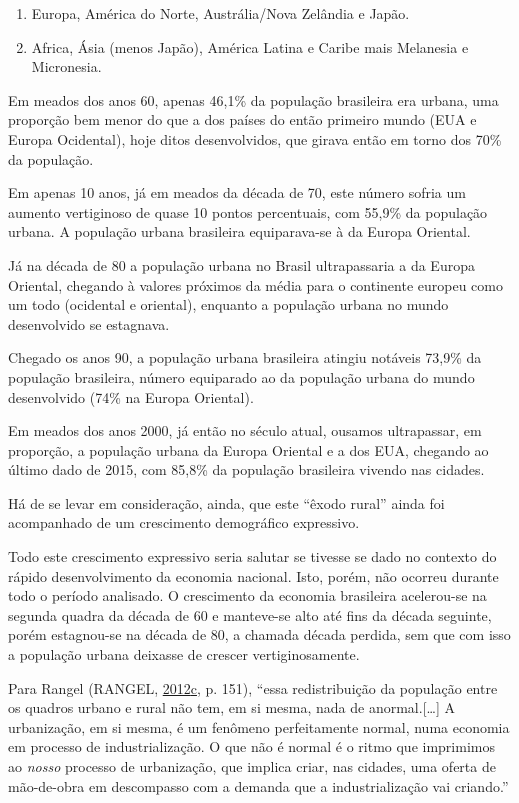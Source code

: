 \documentclass[a4paper, 12pt]{article}
\providecommand{\tightlist}{%
  \setlength{\itemsep}{0pt}\setlength{\parskip}{0pt}}
\begin{document}
\begin{enumerate}
\def\labelenumi{\alph{enumi})}
\tightlist
\item
  Europa, América do Norte, Austrália/Nova Zelândia e Japão.\\
\item
  Africa, Ásia (menos Japão), América Latina e Caribe mais Melanesia e
  Micronesia.
\end{enumerate}

Em meados dos anos 60, apenas 46,1\% da população brasileira era urbana,
uma proporção bem menor do que a dos países do então primeiro mundo (EUA
e Europa Ocidental), hoje ditos desenvolvidos, que girava então em torno
dos 70\% da população.

Em apenas 10 anos, já em meados da década de 70, este número sofria um
aumento vertiginoso de quase 10 pontos percentuais, com 55,9\% da
população urbana. A população urbana brasileira equiparava-se à da
Europa Oriental.

Já na década de 80 a população urbana no Brasil ultrapassaria a da
Europa Oriental, chegando à valores próximos da média para o continente
europeu como um todo (ocidental e oriental), enquanto a população urbana
no mundo desenvolvido se estagnava.

Chegado os anos 90, a população urbana brasileira atingiu notáveis
73,9\% da população brasileira, número equiparado ao da população urbana
do mundo desenvolvido (74\% na Europa Oriental).

Em meados dos anos 2000, já então no século atual, ousamos ultrapassar,
em proporção, a população urbana da Europa Oriental e a dos EUA,
chegando ao último dado de 2015, com 85,8\% da população brasileira
vivendo nas cidades.

Há de se levar em consideração, ainda, que este ``êxodo rural'' ainda
foi acompanhado de um crescimento demográfico expressivo.

Todo este crescimento expressivo seria salutar se tivesse se dado no
contexto do rápido desenvolvimento da economia nacional. Isto, porém,
não ocorreu durante todo o período analisado. O crescimento da economia
brasileira acelerou-se na segunda quadra da década de 60 e manteve-se
alto até fins da década seguinte, porém estagnou-se na década de 80, a
chamada década perdida, sem que com isso a população urbana deixasse de
crescer vertiginosamente.

Para Rangel (RANGEL,
\protect\hyperlink{ref-rangel1986a}{2012}\protect\hyperlink{ref-rangel1986a}{c},
p. 151), ``essa redistribuição da população entre os quadros urbano e
rural não tem, em si mesma, nada de anormal.{[}\ldots{}{]} A
urbanização, em si mesma, é um fenômeno perfeitamente normal, numa
economia em processo de industrialização. O que não é normal é o ritmo
que imprimimos ao \emph{nosso} processo de urbanização, que implica
criar, nas cidades, uma oferta de mão-de-obra em descompasso com a
demanda que a industrialização vai criando.''
\end{document}
